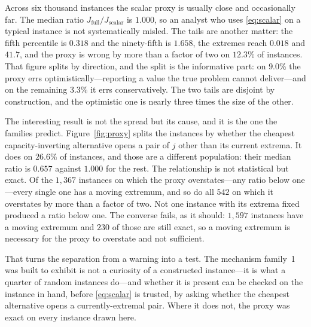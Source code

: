 Across six thousand instances the scalar proxy is usually close and occasionally far. The
median ratio $J_{\mathrm{full}}/J_{\mathrm{scalar}}$ is $1.000$, so an analyst who uses
\eqref{eq:scalar} on a typical instance is not systematically misled. The tails are another
matter: the fifth percentile is $0.318$ and the ninety-fifth is $1.658$, the extremes reach
$0.018$ and $41.7$, and the proxy is wrong by more than a factor of two on $12.3\%$ of
instances. That figure splits by direction, and the split is the informative part: on
$9.0\%$ the proxy errs optimistically---reporting a value the true problem cannot
deliver---and on the remaining $3.3\%$ it errs conservatively. The two tails are disjoint by
construction, and the optimistic one is nearly three times the size of the other. \NUM{}

The interesting result is not the spread but its cause, and it is the one the families
predict. Figure~\ref{fig:proxy} splits the instances by whether the cheapest
capacity-inverting alternative opens a pair of $j$ other than its current extrema. It does on
$26.6\%$ of instances, and those are a different population: their median ratio is $0.657$
against $1.000$ for the rest. The relationship is not statistical but exact. Of the $1{,}367$
instances on which the proxy overstates---any ratio below one---every single one has a moving
extremum, and so do all $542$ on which it overstates by more than a factor of two. Not one
instance with its extrema fixed produced a ratio below one. The converse fails, as it should:
$1{,}597$ instances have a moving extremum and $230$ of those are still exact, so a moving
extremum is necessary for the proxy to overstate and not sufficient. \NUM{}

That turns the separation from a warning into a test. The mechanism family~1 was built to
exhibit is not a curiosity of a constructed instance---it is what a quarter of random
instances do---and whether it is present can be checked on the instance in hand, before
\eqref{eq:scalar} is trusted, by asking whether the cheapest alternative opens a
currently-extremal pair. Where it does not, the proxy was exact on every instance drawn here.

